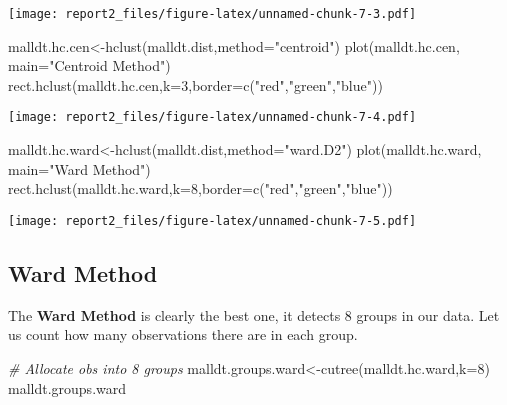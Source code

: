 \documentclass[
]{article}
\newenvironment{Shaded}{\begin{snugshade}}{\end{snugshade}}
\newcommand{\AttributeTok}[1]{\textcolor[rgb]{0.77,0.63,0.00}{#1}}
\newcommand{\CommentTok}[1]{\textcolor[rgb]{0.56,0.35,0.01}{\textit{#1}}}
\newcommand{\DecValTok}[1]{\textcolor[rgb]{0.00,0.00,0.81}{#1}}
\newcommand{\FunctionTok}[1]{\textcolor[rgb]{0.00,0.00,0.00}{#1}}
\newcommand{\NormalTok}[1]{#1}
\newcommand{\OtherTok}[1]{\textcolor[rgb]{0.56,0.35,0.01}{#1}}
\newcommand{\StringTok}[1]{\textcolor[rgb]{0.31,0.60,0.02}{#1}}
\begin{document}
\texttt{[image: report2\_files/figure-latex/unnamed-chunk-7-3.pdf]}

\begin{Shaded}
\begin{Highlighting}[]
\NormalTok{malldt.hc.cen}\OtherTok{\textless{}{-}}\FunctionTok{hclust}\NormalTok{(malldt.dist,}\AttributeTok{method=}\StringTok{"centroid"}\NormalTok{) }
\FunctionTok{plot}\NormalTok{(malldt.hc.cen, }\AttributeTok{main=}\StringTok{"Centroid Method"}\NormalTok{) }
\FunctionTok{rect.hclust}\NormalTok{(malldt.hc.cen,}\AttributeTok{k=}\DecValTok{3}\NormalTok{,}\AttributeTok{border=}\FunctionTok{c}\NormalTok{(}\StringTok{"red"}\NormalTok{,}\StringTok{"green"}\NormalTok{,}\StringTok{"blue"}\NormalTok{)) }
\end{Highlighting}
\end{Shaded}

\texttt{[image: report2\_files/figure-latex/unnamed-chunk-7-4.pdf]}

\begin{Shaded}
\begin{Highlighting}[]
\NormalTok{malldt.hc.ward}\OtherTok{\textless{}{-}}\FunctionTok{hclust}\NormalTok{(malldt.dist,}\AttributeTok{method=}\StringTok{"ward.D2"}\NormalTok{) }
\FunctionTok{plot}\NormalTok{(malldt.hc.ward, }\AttributeTok{main=}\StringTok{"Ward Method"}\NormalTok{) }
\FunctionTok{rect.hclust}\NormalTok{(malldt.hc.ward,}\AttributeTok{k=}\DecValTok{8}\NormalTok{,}\AttributeTok{border=}\FunctionTok{c}\NormalTok{(}\StringTok{"red"}\NormalTok{,}\StringTok{"green"}\NormalTok{,}\StringTok{"blue"}\NormalTok{))}
\end{Highlighting}
\end{Shaded}

\texttt{[image: report2\_files/figure-latex/unnamed-chunk-7-5.pdf]}

\subsection{Ward Method}

The \textbf{Ward Method} is clearly the best one, it detects 8 groups in
our data. Let us count how many observations there are in each group.

\begin{Shaded}
\begin{Highlighting}[]
\CommentTok{\# Allocate obs into 8 groups}
\NormalTok{malldt.groups.ward}\OtherTok{\textless{}{-}}\FunctionTok{cutree}\NormalTok{(malldt.hc.ward,}\AttributeTok{k=}\DecValTok{8}\NormalTok{) }
\NormalTok{malldt.groups.ward}
\end{Highlighting}
\end{Shaded}
\end{document}
